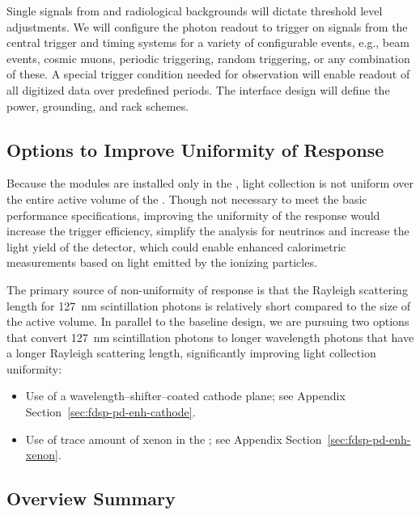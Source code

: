 Single \phel signals from  and radiological backgrounds will dictate threshold level adjustments.
We will configure the photon readout to trigger on signals from the central trigger and timing systems for a variety of configurable events, e.g., beam events, cosmic
muons, periodic triggering, random triggering, or any combination of
these. A special trigger condition needed for  observation will enable readout of all digitized data over predefined periods.
The interface design will define the power, grounding, and rack schemes.


\subsection{Options to Improve Uniformity of Response} 

Because the  modules are installed only in the , light collection is not uniform over the entire active volume of the . 
Though not necessary to meet the basic  performance specifications, improving the uniformity of the response would increase the trigger efficiency, simplify the analysis for  neutrinos and increase the light yield of the detector, which could enable enhanced calorimetric measurements based on light emitted by the ionizing particles.

The primary source of non-uniformity of response is that the Rayleigh scattering length for \SI{127}{nm} scintillation photons is relatively short compared to the size of the  active volume.   
In parallel to the baseline design, we are pursuing two options that convert \SI{127}{nm} scintillation photons to longer wavelength photons that have a longer Rayleigh scattering length, significantly improving light collection uniformity:
\begin{itemize}
\item Use of a wavelength--shifter--coated cathode plane; see Appendix Section~\ref{sec:fdsp-pd-enh-cathode}.
\item Use of trace amount of xenon in the ; see Appendix Section~\ref{sec:fdsp-pd-enh-xenon}.
\end{itemize}


\subsection{Overview Summary} 
\label{sec:fdsp-pd-ov-summ}

